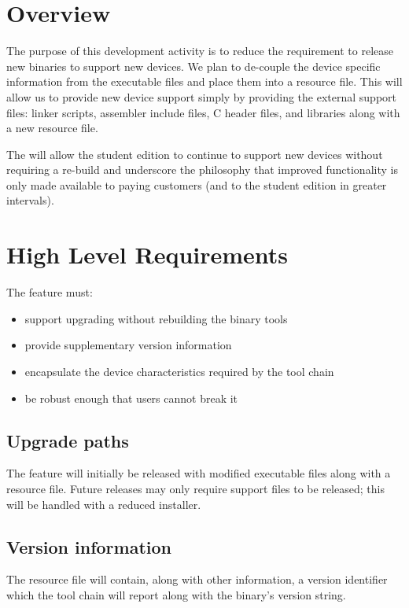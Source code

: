 \documentclass{article}
\begin{document}
\section{Overview}

  The purpose of this development activity is to reduce the requirement to
release new binaries to support new devices.  We plan to de-couple the
device specific information from the executable files and place them into
a resource file.  This will allow us to provide new device support simply 
by providing the external support files: linker scripts, assembler include 
files, C header files, and libraries along with a new resource file.

  The will allow the student edition to continue to support new devices
without requiring a re-build and underscore the philosophy that improved
functionality is only made available to paying customers (and to the
student edition in greater intervals).

\section{High Level Requirements}

  The feature must:
  \begin{itemize}
    \item support upgrading without rebuilding the binary tools
    \item provide supplementary version information
    \item encapsulate the device characteristics required by the tool chain
    \item be robust enough that users cannot break it
  \end{itemize}

\subsection{Upgrade paths}

  The feature will initially be released with modified executable files along 
with a resource file.  Future releases may only require support files to be 
released; this will be handled with a reduced installer.

\subsection{Version information}

  The resource file will contain, along with other information, a version
identifier which the tool chain will report along with the binary's version
string.
\end{document}
